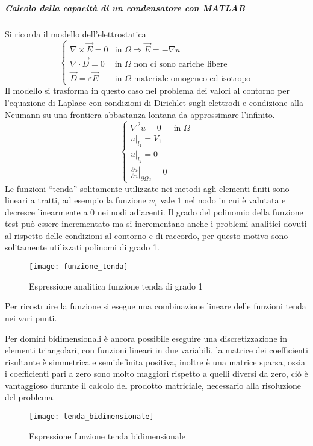 
\subparagraph{Calcolo della capacità di un condensatore con MATLAB}
Si ricorda il modello dell'elettrostatica
$$
\begin{cases}
\nabla \times \vec{E} = 0 &\text{in } \Omega \Rightarrow \vec{E} = -\nabla u\\
\nabla\cdot\vec{D} = 0 &\text{in }\Omega\text{ non ci sono cariche libere}\\
\vec{D} = \varepsilon\vec{E} &\text{in } \Omega\text{ materiale omogeneo ed isotropo}
\end{cases}
$$
Il modello si trasforma in questo caso nel problema dei valori al contorno
per l'equazione di Laplace con condizioni di Dirichlet sugli elettrodi
e condizione alla Neumann su una frontiera abbastanza lontana da approssimare
l'infinito.
$$
\begin{cases}
\nabla^2 u = 0 & \text{in } \Omega\\
\left.u\right|_{l_1} = V_1\\
\left.u\right|_{l_2} = 0\\
\left.\frac{\partial u}{\partial n}\right|_{\partial\Omega e} = 0
\end{cases}
$$
Le funzioni ``tenda'' solitamente utilizzate nei metodi agli elementi finiti
sono lineari a tratti, ad esempio la funzione $w_i$ vale $1$ nel nodo
in cui è valutata e decresce linearmente a $0$ nei nodi adiacenti.
Il grado del polinomio della funzione test può essere incrementato ma
si incrementano anche i problemi analitici dovuti al rispetto
delle condizioni al contorno e di raccordo, per questo motivo sono solitamente
utilizzati polinomi di grado 1.
\begin{figure}[H]
\centering
\texttt{[image: funzione\_tenda]}
\caption{Espressione analitica funzione tenda di grado 1}
\end{figure}
Per ricostruire la funzione si esegue una combinazione lineare delle
funzioni tenda nei vari punti.

Per domini bidimensionali è ancora possibile eseguire una discretizzazione
in elementi triangolari, con funzioni lineari in due variabili,
la matrice dei coefficienti risultante è simmetrica e semidefinita
positiva, inoltre è una matrice sparsa, ossia i coefficienti pari a zero sono 
molto maggiori rispetto a quelli diversi da zero, ciò è vantaggioso
durante il calcolo del prodotto matriciale, necessario alla risoluzione
del problema.
\begin{figure}[H]
\centering
\texttt{[image: tenda\_bidimensionale]}
\caption{Espressione funzione tenda bidimensionale}
\end{figure}

